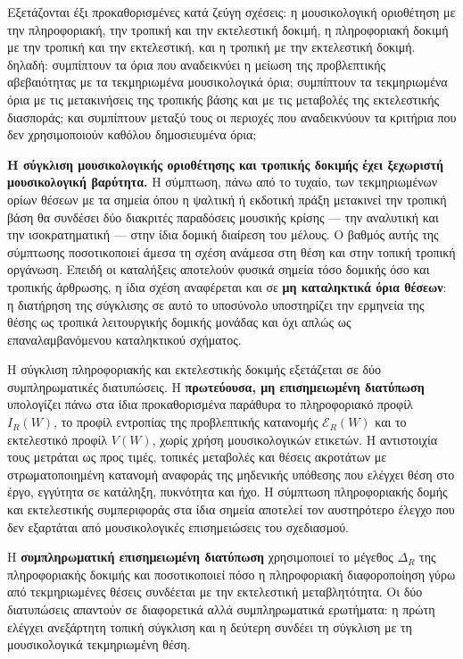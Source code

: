 \documentclass[11pt,a4paper]{article}
\begin{document}
Εξετάζονται έξι προκαθορισμένες κατά ζεύγη σχέσεις: η μουσικολογική οριοθέτηση με την πληροφοριακή, την τροπική και την εκτελεστική δοκιμή, η πληροφοριακή δοκιμή με την τροπική και την εκτελεστική, και η τροπική με την εκτελεστική δοκιμή.
δηλαδή: συμπίπτουν τα όρια που αναδεικνύει η μείωση της προβλεπτικής αβεβαιότητας με τα τεκμηριωμένα μουσικολογικά όρια; συμπίπτουν τα τεκμηριωμένα όρια με τις μετακινήσεις της τροπικής βάσης και με τις μεταβολές της εκτελεστικής διασποράς; και συμπίπτουν μεταξύ τους οι περιοχές που αναδεικνύουν τα κριτήρια που δεν χρησιμοποιούν καθόλου δημοσιευμένα όρια;

\textbf{Η σύγκλιση μουσικολογικής οριοθέτησης και τροπικής δοκιμής έχει ξεχωριστή μουσικολογική βαρύτητα.} Η σύμπτωση, πάνω από το τυχαίο, των τεκμηριωμένων ορίων θέσεων με τα σημεία όπου η ψαλτική ή εκδοτική πράξη μετακινεί την τροπική βάση θα συνδέσει δύο διακριτές παραδόσεις μουσικής κρίσης --- την αναλυτική και την ισοκρατηματική --- στην ίδια δομική διαίρεση του μέλους. Ο βαθμός αυτής της σύμπτωσης ποσοτικοποιεί άμεσα τη σχέση ανάμεσα στη θέση και στην τοπική τροπική οργάνωση. Επειδή οι καταλήξεις αποτελούν φυσικά σημεία τόσο δομικής όσο και τροπικής άρθρωσης, η ίδια σχέση αναφέρεται και σε \textbf{μη καταληκτικά όρια θέσεων}: η διατήρηση της σύγκλισης σε αυτό το υποσύνολο υποστηρίζει την ερμηνεία της θέσης ως τροπικά λειτουργικής δομικής μονάδας και όχι απλώς ως επαναλαμβανόμενου καταληκτικού σχήματος.

Η σύγκλιση πληροφοριακής και εκτελεστικής δοκιμής εξετάζεται σε δύο συμπληρωματικές διατυπώσεις. Η \textbf{πρωτεύουσα, μη επισημειωμένη διατύπωση} υπολογίζει πάνω στα ίδια προκαθορισμένα παράθυρα το πληροφοριακό προφίλ \(I_R(W)\), το προφίλ εντροπίας της προβλεπτικής κατανομής \(\mathcal E_R(W)\) και το εκτελεστικό προφίλ \(V(W)\), χωρίς χρήση μουσικολογικών ετικετών. Η αντιστοιχία τους μετράται ως προς τιμές, τοπικές μεταβολές και θέσεις ακροτάτων με στρωματοποιημένη κατανομή αναφοράς της μηδενικής υπόθεσης που ελέγχει θέση στο έργο, εγγύτητα σε κατάληξη, πυκνότητα και ήχο. Η σύμπτωση πληροφοριακής δομής και εκτελεστικής συμπεριφοράς στα ίδια σημεία αποτελεί τον αυστηρότερο έλεγχο που δεν εξαρτάται από μουσικολογικές επισημειώσεις του σχεδιασμού.

Η \textbf{συμπληρωματική επισημειωμένη διατύπωση} χρησιμοποιεί το μέγεθος \(\Delta_R\) της πληροφοριακής δοκιμής και ποσοτικοποιεί πόσο η πληροφοριακή διαφοροποίηση γύρω από τεκμηριωμένες θέσεις συνδέεται με την εκτελεστική μεταβλητότητα. Οι δύο διατυπώσεις απαντούν σε διαφορετικά αλλά συμπληρωματικά ερωτήματα: η πρώτη ελέγχει ανεξάρτητη τοπική σύγκλιση και η δεύτερη συνδέει τη σύγκλιση με τη μουσικολογικά τεκμηριωμένη θέση.
\end{document}
